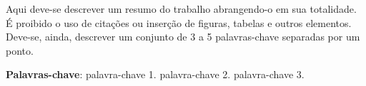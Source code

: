 \documentclass{TCC_UP}
\begin{document}
%        

    \setlength{\absparsep}{18pt} 
    \begin{resumo}
        Aqui deve-se descrever um resumo do trabalho abrangendo-o em sua totalidade. É proibido o uso de citações ou inserção de figuras, tabelas e outros elementos. Deve-se, ainda, descrever um conjunto de 3 a 5 palavras-chave separadas por um ponto.
    
        \textbf{Palavras-chave}: palavra-chave 1. palavra-chave 2. palavra-chave 3.
    \end{resumo}
\end{document}
